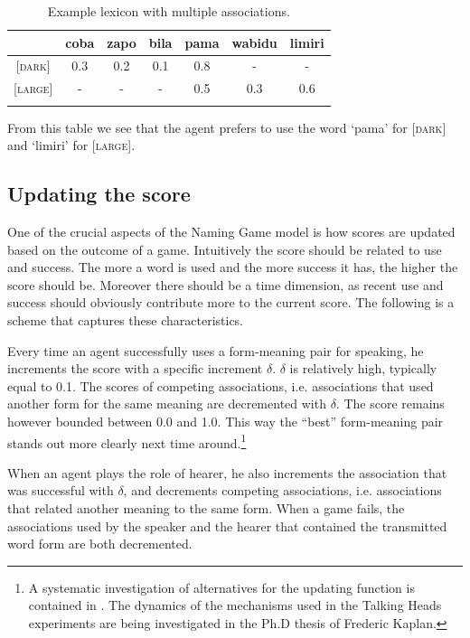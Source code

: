 \begin{table}
\begin{center}
\begin{tabular}{c c c c  c  c  c } \lsptoprule 
& coba & zapo & bila & pama & wabidu & limiri \\ 
\midrule {}		
{}[\textsc{dark}] & 0.3 & 0.2 & 0.1 & 0.8 & - & - \\ 
{}[\textsc{large}] & - & - & - & 0.5 & 0.3 & 0.6 \\ 
\lspbottomrule
\end{tabular}
\caption{\label{tab:mem2}Example lexicon with multiple associations.}
\end{center}
\end{table}
From this table we see that the agent prefers to use the 
word `pama' for [\textsc{dark}] and `limiri' for [\textsc{large}]. 

\subsection{Updating the score}

One of the crucial aspects of the Naming Game model
is how scores are updated based on the outcome of 
a game. Intuitively 
the score should be related to use and success. 
The more a word is used and the more success it 
has, the higher the score should be. Moreover
there should be a time dimension, 
as recent use and success should obviously contribute
more to the current score. 
The following is a scheme that captures these
characteristics. 

Every time an agent successfully uses a form-meaning pair 
for speaking, he increments
the score with a specific increment $\delta$. 
$\delta$ is relatively high, typically equal to 0.1. 
The scores of competing associations, i.e. 
associations that used another form for the same meaning
are decremented with $\delta$. The score remains however bounded 
between 0.0 and 1.0. This way the ``best'' 
form-meaning pair stands out more clearly next time 
around.\footnote{A systematic investigation of alternatives for 
the updating function is contained in \cite{Oliphant:1997}. 
The dynamics of the mechanisms used in the 
Talking Heads experiments are being investigated in the
Ph.D thesis of Frederic Kaplan.}

When an agent plays the role of hearer, he also increments
the association that was successful with $\delta$, and 
decrements competing associations, i.e. associations that related
another meaning to the same form. When a 
game fails, the associations used by the speaker
and the hearer that contained the transmitted 
word form are both decremented. 

